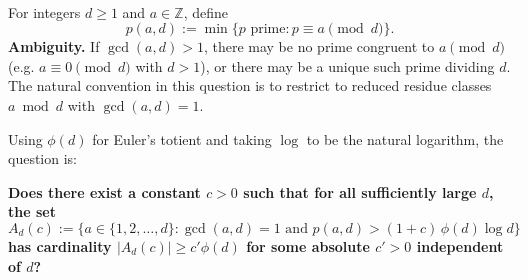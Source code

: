 \\
For integers $d\ge 1$ and $a\in\mathbb{Z}$, define
\[
 p(a,d):=\min\{p\text{ prime}: p\equiv a\pmod d\}.
\]
\textbf{Ambiguity.} If $\gcd(a,d)>1$, there may be no prime congruent to $a\pmod d$ (e.g. $a\equiv 0\pmod d$ with $d>1$), or there may be a unique such prime dividing $d$.  The natural convention in this question is to restrict to reduced residue classes $a\bmod d$ with $\gcd(a,d)=1$.

Using $\phi(d)$ for Euler's totient and taking $\log$ to be the natural logarithm, the question is:

\textbf{Does there exist a constant $c>0$ such that for all sufficiently large $d$, the set}
\[
 A_d(c):=\{a\in\{1,2,\dots,d\}: \gcd(a,d)=1\text{ and }p(a,d)>(1+c)\,\phi(d)\log d\}
\]
\textbf{has cardinality $|A_d(c)|\ge c'\phi(d)$ for some absolute $c'>0$ independent of $d$?}
